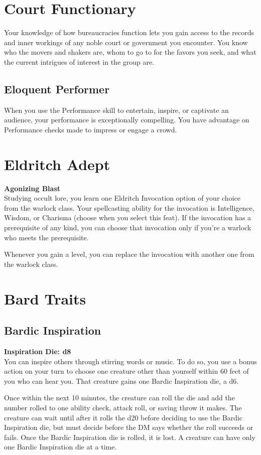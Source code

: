 \documentclass[letterpaper,openany,oneside,twocolumn]{book}
\begin{document}
\section*{Court Functionary}
Your knowledge of how bureaucracies function lets you gain access to the records and inner workings of any noble court or government you encounter. You know who the movers and shakers are, whom to go to for the favors you seek, and what the current intrigues of interest in the group are.
\subsection*{Eloquent Performer}
When you use the Performance skill to entertain, inspire, or captivate an audience, your performance is exceptionally compelling. You have advantage on Performance checks made to impress or engage a crowd.

\section*{Eldritch Adept}
\textbf{Agonizing Blast}\\
Studying occult lore, you learn one Eldritch Invocation option of your choice from the warlock class. Your spellcasting ability for the invocation is Intelligence, Wisdom, or Charisma (choose when you select this feat). If the invocation has a prerequisite of any kind, you can choose that invocation only if you’re a warlock who meets the prerequisite.

Whenever you gain a level, you can replace the invocation with another one from the warlock class.

\section*{Bard Traits}
\subsection*{Bardic Inspiration}
\textbf{Inspiration Die: d8}\\
You can inspire others through stirring words or music. To do so, you use a bonus action on your turn to choose one creature other than yourself within 60 feet of you who can hear you. That creature gains one Bardic Inspiration die, a d6.

Once within the next 10 minutes, the creature can roll the die and add the number rolled to one ability check, attack roll, or saving throw it makes. The creature can wait until after it rolls the d20 before deciding to use the Bardic Inspiration die, but must decide before the DM says whether the roll succeeds or fails. Once the Bardic Inspiration die is rolled, it is lost. A creature can have only one Bardic Inspiration die at a time.
\end{document}
